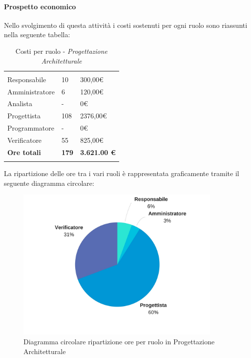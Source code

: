 			\paragraph{Prospetto economico} \Spazio
			Nello svolgimento di questa attività i costi sostenuti per ogni ruolo sono riassunti nella seguente tabella:
			\begin{table}[H]
			\centering
			\begin{tabular}{p{4cm}|C{4cm}|C{4cm}}
				
				 & &\\
				Responsabile & 10 & 300,00\euro \\
				\hline
				Amministratore& 6 & 120,00\euro \\
				\hline
				Analista & - & 0\euro \\
				\hline
				Progettista & 108 & 2376,00\euro \\
				\hline
				Programmatore & - & 0\euro \\
				\hline
				Verificatore & 55 & 825,00\euro \\
				\hline
				\textbf{Ore totali} & \textbf{179} & \textbf{3.621.00 \euro} \\
			\end{tabular}
			\caption{Costi per ruolo - \textit{Progettazione Architetturale}}
		\end{table}
		
		La ripartizione delle ore tra i vari ruoli è rappresentata graficamente tramite il seguente diagramma circolare:
		
		\begin{figure}[h] 
			\centering 
			\includegraphics[width=0.9\textwidth]{images/CircolareProgettazioneArchitetturale.jpg} 
			\caption{Diagramma circolare ripartizione ore per ruolo in Progettazione Architetturale}
			\label{CircolareProgettazioneArchitetturale}
		\end{figure}		

